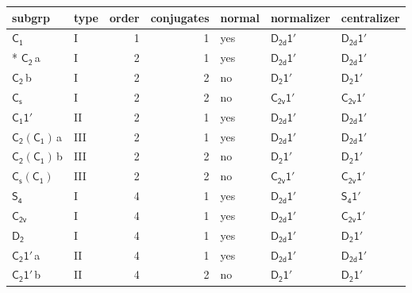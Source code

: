 \documentclass[10pt,a4paper]{article}
\numberwithin{equation}{section}
\newcommand{\grp}[1]{\mathsf{#1}}
\newcommand{\clsletter}[1]{\,{\scriptsize\color{black!55}#1}}
\begin{document}
{\small\begin{longtable}{@{}llrrlll@{}}\toprule
subgrp & type & order & conjugates & normal & normalizer & centralizer\\\midrule\endhead
\bottomrule\endfoot\endlastfoot
\href{../../../rotation/data/pdf/C1.pdf}{$\grp{C_{1}}$} & I & 1 & 1 & yes & \href{D2d-1p.pdf}{$\grp{D_{2d}1'}$} & \href{D2d-1p.pdf}{$\grp{D_{2d}1'}$}\\*
\href{../../../rotation/data/pdf/C2.pdf}{$\grp{C_{2}}$}\clsletter{a} & I & 2 & 1 & yes & \href{D2d-1p.pdf}{$\grp{D_{2d}1'}$} & \href{D2d-1p.pdf}{$\grp{D_{2d}1'}$}\\
\href{../../../rotation/data/pdf/C2.pdf}{$\grp{C_{2}}$}\clsletter{b} & I & 2 & 2 & no & \href{D2-1p.pdf}{$\grp{D_{2}1'}$} & \href{D2-1p.pdf}{$\grp{D_{2}1'}$}\\
\href{../../../rotation/data/pdf/C1v.pdf}{$\grp{C_{s}}$} & I & 2 & 2 & no & \href{C2v-1p.pdf}{$\grp{C_{2v}1'}$} & \href{C2v-1p.pdf}{$\grp{C_{2v}1'}$}\\
\href{C1-1p.pdf}{$\grp{C_{1}1'}$} & II & 2 & 1 & yes & \href{D2d-1p.pdf}{$\grp{D_{2d}1'}$} & \href{D2d-1p.pdf}{$\grp{D_{2d}1'}$}\\
\href{C2-C1.pdf}{$\grp{C_{2}}(\grp{C_{1}})$}\clsletter{a} & III & 2 & 1 & yes & \href{D2d-1p.pdf}{$\grp{D_{2d}1'}$} & \href{D2d-1p.pdf}{$\grp{D_{2d}1'}$}\\
\href{C2-C1.pdf}{$\grp{C_{2}}(\grp{C_{1}})$}\clsletter{b} & III & 2 & 2 & no & \href{D2-1p.pdf}{$\grp{D_{2}1'}$} & \href{D2-1p.pdf}{$\grp{D_{2}1'}$}\\
\href{C1v-C1.pdf}{$\grp{C_{s}}(\grp{C_{1}})$} & III & 2 & 2 & no & \href{C2v-1p.pdf}{$\grp{C_{2v}1'}$} & \href{C2v-1p.pdf}{$\grp{C_{2v}1'}$}\\
\href{../../../rotation/data/pdf/S4.pdf}{$\grp{S_{4}}$} & I & 4 & 1 & yes & \href{D2d-1p.pdf}{$\grp{D_{2d}1'}$} & \href{S4-1p.pdf}{$\grp{S_{4}1'}$}\\
\href{../../../rotation/data/pdf/C2v.pdf}{$\grp{C_{2v}}$} & I & 4 & 1 & yes & \href{D2d-1p.pdf}{$\grp{D_{2d}1'}$} & \href{C2v-1p.pdf}{$\grp{C_{2v}1'}$}\\
\href{../../../rotation/data/pdf/D2.pdf}{$\grp{D_{2}}$} & I & 4 & 1 & yes & \href{D2d-1p.pdf}{$\grp{D_{2d}1'}$} & \href{D2-1p.pdf}{$\grp{D_{2}1'}$}\\
\href{C2-1p.pdf}{$\grp{C_{2}1'}$}\clsletter{a} & II & 4 & 1 & yes & \href{D2d-1p.pdf}{$\grp{D_{2d}1'}$} & \href{D2d-1p.pdf}{$\grp{D_{2d}1'}$}\\
\href{C2-1p.pdf}{$\grp{C_{2}1'}$}\clsletter{b} & II & 4 & 2 & no & \href{D2-1p.pdf}{$\grp{D_{2}1'}$} & \href{D2-1p.pdf}{$\grp{D_{2}1'}$}\\

\end{longtable}}
\end{document}
